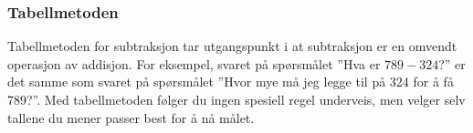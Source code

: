 \subsubsection{Tabellmetoden}
Tabellmetoden for subtraksjon tar utgangspunkt i at subtraksjon er en omvendt operasjon av addisjon. For eksempel, svaret på spørsmålet ''Hva er $ 789-324 $?'' er det samme som svaret på spørsmålet ''Hvor mye må jeg legge til på 324 for å få 789?''. Med tabellmetoden følger du ingen spesiell regel underveis, men velger selv tallene du mener passer best for å nå målet.\\
\begin{center}
\parbox{0.35\linewidth}{
} \qquad
\parbox{0.35\linewidth}{
	} \\[12pt]
\parbox{0.35\linewidth}{
	} \qquad 
\parbox{0.4\linewidth}{
	}
\end{center}
